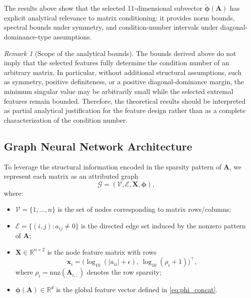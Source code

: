 \documentclass[11pt,a4paper]{article}
\theoremstyle{plain}
\theoremstyle{definition}
\theoremstyle{remark}
\newtheorem{remark}{Remark}
\begin{document}
The results above show that the selected 11-dimensional subvector
$\widetilde{\bm{\phi}}(\mathbf A)$ has explicit analytical relevance to matrix conditioning: it provides norm bounds, spectral bounds under symmetry, and condition-number intervals under diagonal-dominance-type assumptions.

\begin{remark}[Scope of the analytical bounds]
The bounds derived above do not imply that the selected features fully determine the condition number of an arbitrary matrix. In particular, without additional structural assumptions, such as symmetry, positive definiteness, or a positive diagonal-dominance margin, the minimum singular value may be arbitrarily small while the selected extremal features remain bounded. Therefore, the theoretical results should be interpreted as partial analytical justification for the feature design rather than as a complete characterization of the condition number.
\end{remark}



\subsection{Graph Neural Network Architecture}

To leverage the structural information encoded in the sparsity pattern of $\mathbf{A}$, we represent each matrix as an attributed graph
\[
\mathcal{G} = (\mathcal{V}, \mathcal{E}, \mathbf{X}, \bm{\phi}),
\]
where:
\begin{itemize}
\item $\mathcal{V} = \{1, \ldots, n\}$ is the set of nodes corresponding to matrix rows/columns;
\item $\mathcal{E} = \{(i,j) : a_{ij} \neq 0\}$ is the directed edge set induced by the nonzero pattern of $\mathbf{A}$;
\item $\mathbf{X} \in \mathbb{R}^{n \times 2}$ is the node feature matrix with rows
\begin{equation}\label{eq:node_features}
\mathbf{x}_i =
\bigl(
\log_{10}(|a_{ii}| + \epsilon),\
\log_{10}(\rho_i + 1)
\bigr)^\top,
\end{equation}
where $\rho_i = \mathrm{nnz}(\mathbf{A}_{i,:})$ denotes the row sparsity;
\item $\bm{\phi}(\mathbf{A}) \in \mathbb{R}^{d}$ is the global feature vector defined in \eqref{eq:phi_concat}.
\end{itemize}
\end{document}

